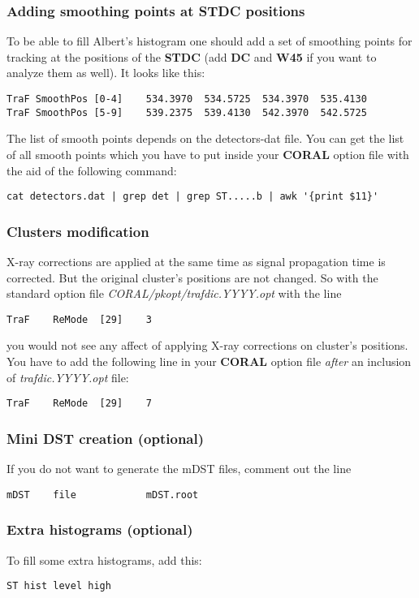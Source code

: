 \documentclass[a4paper,12pt]{article}
\begin{document}
\begin{enumerate}
\subsubsection{Adding smoothing points at {\bf STDC} positions}
To be able to fill Albert's histogram one should add a set of smoothing points for tracking at the positions
of the {\bf STDC} (add {\bf DC} and {\bf W45} if you want to analyze them as well). It looks like this:
\begin{verbatim}
TraF SmoothPos [0-4]    534.3970  534.5725  534.3970  535.4130
TraF SmoothPos [5-9]    539.2375  539.4130  542.3970  542.5725
\end{verbatim}
The list of smooth points depends on the detectors-dat file. You can get the list of all smooth points
which you have to put inside your {\bf CORAL} option file with the aid of the following command:
\begin{verbatim}
cat detectors.dat | grep det | grep ST.....b | awk '{print $11}'
\end{verbatim}

\subsubsection{Clusters modification}
X-ray corrections are applied at the same time as signal propagation time is
corrected. But the original cluster's positions are not changed. So with the
standard option file {\it CORAL/pkopt/trafdic.YYYY.opt} with the line
\begin{verbatim}
TraF	ReMode	[29]	3
\end{verbatim}
you would not see any affect of applying X-ray corrections on cluster's positions.
You have to add the following
line in your {\bf CORAL} option file {\it after} an inclusion of {\it trafdic.YYYY.opt} file:
\begin{verbatim}
TraF	ReMode	[29]	7
\end{verbatim}

\subsubsection{Mini DST creation (optional)}
If you do not want to generate the mDST files, comment out the line
\begin{verbatim}
mDST    file            mDST.root
\end{verbatim}

\subsubsection{Extra histograms (optional)}
To fill some extra histograms, add this:
\begin{verbatim}
ST hist level high
\end{verbatim}


\end{enumerate}
\end{document}
